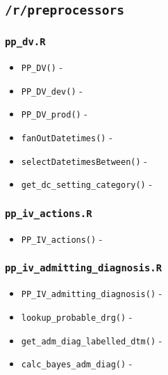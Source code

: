 \documentclass[
]{book}
\providecommand{\tightlist}{%
  \setlength{\itemsep}{0pt}\setlength{\parskip}{0pt}}
\begin{document}
\hypertarget{rpreprocessors-1}{%
\subsection{\texorpdfstring{\texttt{/r/preprocessors}}{/r/preprocessors}}\label{rpreprocessors-1}}

\hypertarget{pp_dv.r-1}{%
\subsubsection{\texorpdfstring{\texttt{pp\_dv.R}}{pp\_dv.R}}\label{pp_dv.r-1}}

\begin{itemize}
\tightlist
\item
  \texttt{PP\_DV()} -
\item
  \texttt{PP\_DV\_dev()} -
\item
  \texttt{PP\_DV\_prod()} -
\item
  \texttt{fanOutDatetimes()} -
\item
  \texttt{selectDatetimesBetween()} -
\item
  \texttt{get\_dc\_setting\_category()} -
\end{itemize}

\hypertarget{pp_iv_actions.r}{%
\subsubsection{\texorpdfstring{\texttt{pp\_iv\_actions.R}}{pp\_iv\_actions.R}}\label{pp_iv_actions.r}}

\begin{itemize}
\tightlist
\item
  \texttt{PP\_IV\_actions()} -
\end{itemize}

\hypertarget{pp_iv_admitting_diagnosis.r}{%
\subsubsection{\texorpdfstring{\texttt{pp\_iv\_admitting\_diagnosis.R}}{pp\_iv\_admitting\_diagnosis.R}}\label{pp_iv_admitting_diagnosis.r}}

\begin{itemize}
\tightlist
\item
  \texttt{PP\_IV\_admitting\_diagnosis()} -
\item
  \texttt{lookup\_probable\_drg()} -
\item
  \texttt{get\_adm\_diag\_labelled\_dtm()} -
\item
  \texttt{calc\_bayes\_adm\_diag()} -
\end{itemize}
\end{document}

